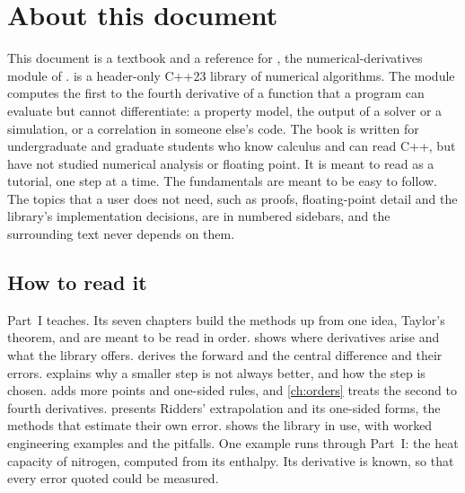 \chapter*{About this document}

This document is a textbook and a reference for , the numerical-derivatives module of \nxx{}.
\nxx{} is a header-only C++23 library of numerical algorithms. The module computes the first to the fourth
derivative of a function that a program can evaluate but cannot differentiate: a property model, the output of a
solver or a simulation, or a correlation in someone else's code. The book is written for undergraduate and graduate
students who know calculus and can read C++, but have not studied numerical analysis or floating point. It is meant
to read as a tutorial, one step at a time. The fundamentals are meant to be easy to follow. The topics that a user
does not need, such as proofs, floating-point detail and the library's implementation decisions, are in numbered
sidebars, and the surrounding text never depends on them.

\section*{How to read it}

Part~I teaches. Its seven chapters build the methods up from one idea, Taylor's theorem, and are meant to be read in
order.  shows where derivatives arise and what the library offers.  derives the forward
and the central difference and their errors.  explains why a smaller step is not always better,
and how the step is chosen.  adds more points and one-sided rules, and \cref{ch:orders} treats the
second to fourth derivatives.  presents Ridders' extrapolation and its one-sided forms, the methods
that estimate their own error.  shows the library in use, with worked engineering examples and the
pitfalls. One example runs through Part~I: the heat capacity of nitrogen, computed from its enthalpy. Its derivative
is known, so that every error quoted could be measured.

